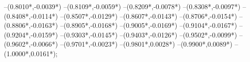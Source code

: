 {	--({0.8010*\xskala},{-0.0039*\yskala})
	--({0.8109*\xskala},{-0.0059*\yskala})
	--({0.8209*\xskala},{-0.0078*\yskala})
	--({0.8308*\xskala},{-0.0097*\yskala})
	--({0.8408*\xskala},{-0.0114*\yskala})
	--({0.8507*\xskala},{-0.0129*\yskala})
	--({0.8607*\xskala},{-0.0143*\yskala})
	--({0.8706*\xskala},{-0.0154*\yskala})
	--({0.8806*\xskala},{-0.0163*\yskala})
	--({0.8905*\xskala},{-0.0168*\yskala})
	--({0.9005*\xskala},{-0.0169*\yskala})
	--({0.9104*\xskala},{-0.0167*\yskala})
	--({0.9204*\xskala},{-0.0159*\yskala})
	--({0.9303*\xskala},{-0.0145*\yskala})
	--({0.9403*\xskala},{-0.0126*\yskala})
	--({0.9502*\xskala},{-0.0099*\yskala})
	--({0.9602*\xskala},{-0.0066*\yskala})
	--({0.9701*\xskala},{-0.0023*\yskala})
	--({0.9801*\xskala},{0.0028*\yskala})
	--({0.9900*\xskala},{0.0089*\yskala})
	--({1.0000*\xskala},{0.0161*\yskala});
}
\def\punktzero{
\fill[color=red] ({-0.9749*\xskala},\yskala) circle[radius={0.08/\skala}];
;
}
